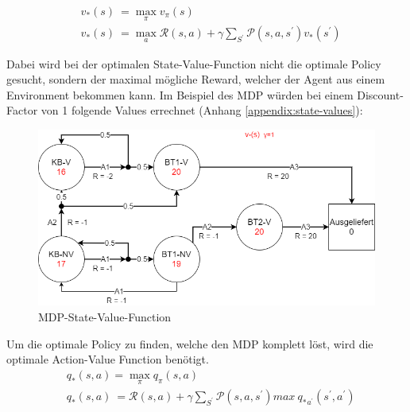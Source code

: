\begin{align}
&v_\ast(s)\ =\max_\pi{v_\pi}(s) \nonumber\\
&v_\ast(s)\ =\max_a{\mathcal{R}(s,a)}+\gamma\sum_{S^\prime}{\mathcal{P}(s,a,s^\prime)}v_\ast(s^\prime) \label{bellman-opt-equa}
\end{align}


\newpage
Dabei wird bei der optimalen State-Value-Function nicht die optimale Policy gesucht, sondern der maximal mögliche Reward, welcher der Agent aus einem Environment bekommen kann. Im Beispiel des MDP würden bei einem Discount-Factor von 1 folgende Values errechnet (Anhang \ref{appendix:state-values}):

\begin{figure}[ht]
  \centering
  \includegraphics[width=\textwidth]{img/MDP_State-Value_Function.png}
  \caption{MDP-State-Value-Function}
    \label{fig:mdp-value}
\end{figure}
Um die optimale Policy zu finden, welche den MDP komplett löst, wird die optimale Action-Value Function benötigt.
\begin{align}
&q_\ast\left(s,a\right)=\max_\pi{q_\pi}\left(s,a\right) \nonumber\\
&q_\ast(s,a)\ =\mathcal{R}(s,a)+\gamma\sum_{S^\prime}{\mathcal{P}(s,a,s^\prime)}{max\ {q_\ast}_{a^\prime}(s^\prime,a^\prime)} \label{bellman-opt-equa-q}
\end{align}

